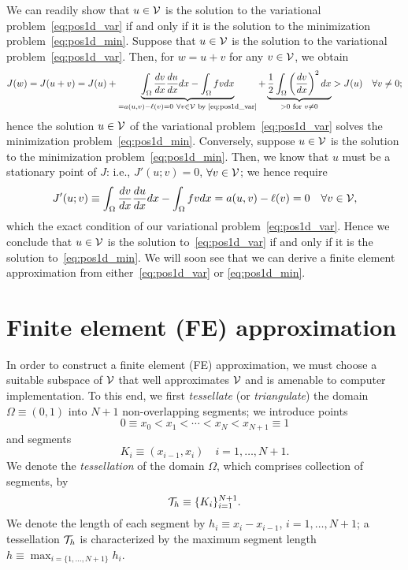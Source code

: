We can readily show that $u \in \mathcal{V}$ is the solution to the variational problem~\eqref{eq:pos1d_var} if and only if it is the solution to the minimization problem~\eqref{eq:pos1d_min}.  Suppose that $u \in \mathcal{V}$ is the solution to the variational problem~\eqref{eq:pos1d_var}.  Then, for $w = u + v$ for any $v \in \mathcal{V}$, we obtain
\begin{align*}
  J(w) = J(u + v) = J(u) + \underbrace{ \int_{\Omega} \frac{d v}{d x} \frac{d u}{d x} dx - \int_\Omega f v dx}_{= a(u,v) - \ell(v) = 0 \ \forall v \in \mathcal{V} \text{ by \eqref{eq:pos1d_var}}}
  + \underbrace{ \frac{1}{2} \int_{\Omega} \left( \frac{d v}{d x} \right)^2 dx }_{> 0 \text{ for } v \neq 0} > J(u) \quad \forall v \neq 0;
\end{align*}
hence the solution $u \in \mathcal{V}$ of the variational problem~\eqref{eq:pos1d_var} solves the minimization problem~\eqref{eq:pos1d_min}. 
Conversely, suppose $u \in \mathcal{V}$ is the solution to the minimization problem~\eqref{eq:pos1d_min}.  Then, we know that $u$ must be a stationary point of $J$: i.e., $J'(u;v) = 0$, $\forall v \in \mathcal{V}$; we hence require
\begin{equation*}
  J'(u;v) \equiv
  \int_{\Omega} \frac{d v}{d x} \frac{d u}{d x} dx
  - \int_{\Omega} f v dx
  = a(u,v) - \ell(v) = 0 \quad \forall v \in \mathcal{V},
\end{equation*}
which the exact condition of our variational problem~\eqref{eq:pos1d_var}. Hence we conclude that $u \in \mathcal{V}$ is the solution to~\eqref{eq:pos1d_var} if and only if it is the solution to~\eqref{eq:pos1d_min}.  We will soon see that we can derive a finite element approximation from either~\eqref{eq:pos1d_var} or \eqref{eq:pos1d_min}.

\section{Finite element (FE) approximation}
In order to construct a finite element (FE) approximation, we must choose a suitable subspace of $\mathcal{V}$ that well approximates $\mathcal{V}$ and is amenable to computer implementation. To this end, we first \emph{tessellate} (or \emph{triangulate}) the domain $\Omega \equiv (0,1)$ into $N+1$ non-overlapping segments; we introduce points
\begin{equation*}
  0 \equiv x_0 < x_1 < \cdots < x_N < x_{N+1} \equiv 1
\end{equation*}
and segments
\begin{equation*}
  K_i \equiv (x_{i-1}, x_i) \quad i = 1,\dots,N+1.
\end{equation*}
We denote the \emph{tessellation} of the domain $\Omega$, which comprises collection of segments, by
\begin{equation}
  \mathcal{T}_h \equiv \{ K_i \}_{i=1}^{N+1}.
  \label{eq:pos1d_Th}
\end{equation}
We denote the length of each segment by $h_i \equiv x_i - x_{i-1}$, $i = 1,\dots,N+1$; a tessellation $\mathcal{T}_h$ is characterized by the maximum segment length $h \equiv \max_{i=\{ 1,\dots,N+1\}} h_i$.

